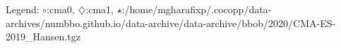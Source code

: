 Legend: {\color{NavyBlue}$\circ$}:cma0, {\color{Magenta}$\diamondsuit$}:cma1, {\color{Orange}$\star$}:/home/mgharafixp/.cocopp/data-archives/numbbo.github.io/data-archive/data-archive/bbob/2020/CMA-ES-2019\_Hansen.tgz